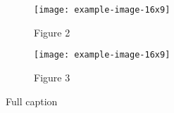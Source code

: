 \documentclass{article}
\begin{document}
\begin{figure}
\centering


\usebox{\bigimage}\hfill
\begin{minipage}[b][\ht\bigimage][s]{.58\textwidth}
  \begin{subfigure}{\textwidth}
  \centering
  \texttt{[image: example-image-16x9]}
  \caption{Figure 2}
  \end{subfigure}%
  \vfill
  \begin{subfigure}{\textwidth}
  \centering
  \texttt{[image: example-image-16x9]}
  \caption{Figure 3}
  \end{subfigure}

  \vspace{0pt}%
\end{minipage}

\caption{Full caption}

\end{figure}
\end{document}
